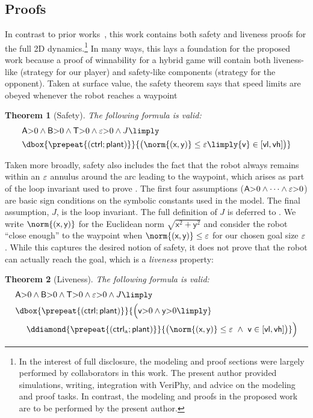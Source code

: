 \documentclass[12pt]{cmuthesis}
\newtheorem{theorem}{Theorem}
\theoremstyle{definition}
\theoremstyle{remark}
\newcommand{\xgvar}{\textsf{x}}
\newcommand{\ygvar}{\textsf{y}}
\newcommand{\yvar}{\textsf{y}}
\newcommand{\vlvar}{\textsf{vl}}
\newcommand{\vhvar}{\textsf{vh}}
\newcommand{\Tvar}{{\sf T}\xspace}
\newcommand{\Avar}{{\sf A}\xspace}
\newcommand{\Bvar}{{\sf B}\xspace}
\newcommand{\vvar}{{\sf v}\xspace}
\newcommand{\avar}{{\sf a}\xspace}
\newcommand{\ctrl}{\textsf{ctrl}\xspace}
\newcommand{\ctrlliv}{\ctrl_{\text{a}}}
\newcommand{\plant}{\textsf{plant}\xspace}
\newcommand{\enorm}[1]{\norm{#1}}
\newcommand{\linv}{J}
\newcommand{\rref}[2][]{\prettyref{#2}}
\newcommand{\VeriPhy}{VeriPhy\xspace}
\begin{document}
\subsection{Proofs}
In contrast to prior works~\cite{DBLP:journals/ijrr/MitschGVP17}, this work contains both safety and liveness proofs for the full 2D dynamics.\footnote{In the interest of full disclosure, the modeling and proof sections were largely performed by collaborators in this work. The present author provided simulations, writing, integration with \VeriPhy, and advice on the modeling and proof tasks. In contrast, the modeling and proofs in the proposed work are to be performed by the present author.}
In many ways, this lays a foundation for the proposed work because a proof of winnability for a hybrid game will contain both liveness-like (strategy for our player) and safety-like components (strategy for the opponent).
Taken at surface value, the safety theorem says that speed limits are obeyed whenever the robot reaches a waypoint
\begin{theorem}[Safety]
\label{thm:safe}
The following \dL formula is valid:
\begin{align*}
&\Avar{>}0 \land \Bvar{>}0 \land \Tvar{>}0 \land \veps{>}0 \land \linv \limply \\
&\dbox{\prepeat{(\ctrl;\plant)}}{\big(\enorm{(\xgvar,\ygvar)} \leq \veps \limply \vvar \in [\vlvar,\vhvar]\big)}
\end{align*}
\end{theorem}
Taken more broadly, safety also includes the fact that the robot always remains within an $\varepsilon$ annulus around the arc leading to the waypoint, which arises as part of the loop invariant used to prove \rref{thm:safe}.
The first four assumptions ($\Avar{>}0 \land \dots \land \veps{>}0$) are basic sign conditions on the symbolic constants used in the model. 
The final assumption, $\linv$, is the loop invariant.
The full definition of $\linv$ is deferred to \rref{sec:ground-robotics}.
We write $\enorm{(\xgvar,\ygvar)}$ for the Euclidean norm $\sqrt{\xgvar^2 + \ygvar^2}$ and consider the robot ``close enough'' to the waypoint when $\enorm{(\xgvar,\ygvar)} \leq \veps$ for our chosen goal size $\varepsilon$.
While this captures the desired notion of safety, it does not prove that the robot can actually reach the goal, which is a \emph{liveness} property:
\begin{theorem}[Liveness]
\label{thm:liveness}
The following \dL formula is valid:
\begin{align*}
&\Avar{>}0 \land \Bvar{>}0 \land \Tvar{>}0 \land \veps{>}0 \land \linv \limply \\
&\dbox{\prepeat{(\ctrl;\plant)}}{\Big( \vvar{>}0 \land \yvar{>}0 \limply }\\
&\ \ \ \ \ddiamond{\prepeat{(\ctrlliv;\plant)}}{\big(\enorm{(\xgvar,\ygvar)} \leq \veps~\land~\vvar \in [\vlvar,\vhvar]\big)} \Big)
\end{align*}
\end{theorem}
\end{document}
